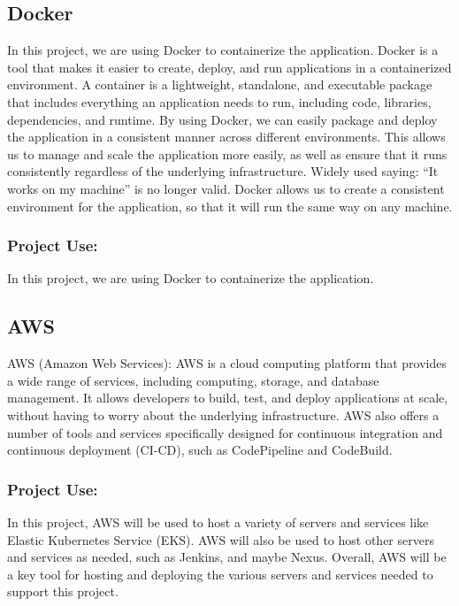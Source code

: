 \documentclass[
  10pt,
  paper=a4,
  ,captions=tableheading
]{scrartcl}
\begin{document}
\hypertarget{docker}{%
\subsection{Docker}\label{docker}}

In this project, we are using Docker to containerize the application.
Docker is a tool that makes it easier to create, deploy, and run
applications in a containerized environment. A container is a
lightweight, standalone, and executable package that includes everything
an application needs to run, including code, libraries, dependencies,
and runtime. By using Docker, we can easily package and deploy the
application in a consistent manner across different environments. This
allows us to manage and scale the application more easily, as well as
ensure that it runs consistently regardless of the underlying
infrastructure. Widely used saying: ``It works on my machine'' is no
longer valid. Docker allows us to create a consistent environment for
the application, so that it will run the same way on any machine.

\hypertarget{project-use-3}{%
\subsubsection{Project Use:}\label{project-use-3}}

In this project, we are using Docker to containerize the application.

\hypertarget{aws}{%
\subsection{AWS}\label{aws}}

AWS (Amazon Web Services): AWS is a cloud computing platform that
provides a wide range of services, including computing, storage, and
database management. It allows developers to build, test, and deploy
applications at scale, without having to worry about the underlying
infrastructure. AWS also offers a number of tools and services
specifically designed for continuous integration and continuous
deployment (CI-CD), such as CodePipeline and CodeBuild.

\hypertarget{project-use-4}{%
\subsubsection{Project Use:}\label{project-use-4}}

In this project, AWS will be used to host a variety of servers and
services like Elastic Kubernetes Service (EKS). AWS will also be used to
host other servers and services as needed, such as Jenkins, and maybe
Nexus. Overall, AWS will be a key tool for hosting and deploying the
various servers and services needed to support this project.
\end{document}
